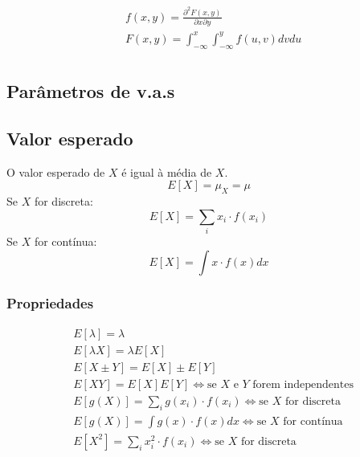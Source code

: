 \documentclass[a4paper]{article}
\begin{document}
\begin{multicols}{3}
\begin{align*}
  &f(x, y) = \frac{\partial^2 F(x, y)}{\partial x \partial y} \\
  &F(x, y) = \int_{-\infty}^x \int_{-\infty}^y f(u, v) dv du \\
\end{align*}

\subsection{Parâmetros de v.a.s}
\subsection{Valor esperado}
O valor esperado de $X$ é igual à média de $X$.
$$E[X] = \mu_X = \mu$$
Se $X$ for discreta:
$$E[X] = \sum_i x_i \cdot f(x_i)$$
Se $X$ for contínua:
$$E[X] = \int x \cdot f(x) dx$$
\subsubsection{Propriedades}
\begin{align*}
  &E[\lambda] = \lambda \\
  &E[\lambda X] = \lambda E[X] \\
  &E[X \pm Y] = E[X] \pm E[Y] \\
  &E[X Y] = E[X] E[Y] \iff \text{se } X \text{ e } Y \text{ forem independentes} \\
  &E[g(X)] = \sum_i g(x_i) \cdot f(x_i) \iff \text{se } X \text{ for discreta} \\
  &E[g(X)] = \int g(x) \cdot f(x) dx \iff \text{se } X \text{ for contínua} \\
  &E[X^2] = \sum_i x_i^2 \cdot f(x_i) \iff \text{se } X \text{ for discreta}
\end{align*}

\end{multicols}
\end{document}
